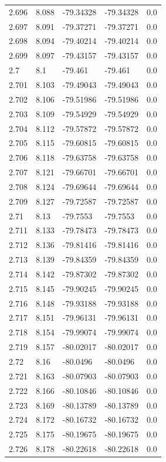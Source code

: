 \begin{tabular}{lllll}
2.696 & 8.088 & -79.34328 & -79.34328 & 0.0 \\
2.697 & 8.091 & -79.37271 & -79.37271 & 0.0 \\
2.698 & 8.094 & -79.40214 & -79.40214 & 0.0 \\
2.699 & 8.097 & -79.43157 & -79.43157 & 0.0 \\
2.7 & 8.1 & -79.461 & -79.461 & 0.0 \\
2.701 & 8.103 & -79.49043 & -79.49043 & 0.0 \\
2.702 & 8.106 & -79.51986 & -79.51986 & 0.0 \\
2.703 & 8.109 & -79.54929 & -79.54929 & 0.0 \\
2.704 & 8.112 & -79.57872 & -79.57872 & 0.0 \\
2.705 & 8.115 & -79.60815 & -79.60815 & 0.0 \\
2.706 & 8.118 & -79.63758 & -79.63758 & 0.0 \\
2.707 & 8.121 & -79.66701 & -79.66701 & 0.0 \\
2.708 & 8.124 & -79.69644 & -79.69644 & 0.0 \\
2.709 & 8.127 & -79.72587 & -79.72587 & 0.0 \\
2.71 & 8.13 & -79.7553 & -79.7553 & 0.0 \\
2.711 & 8.133 & -79.78473 & -79.78473 & 0.0 \\
2.712 & 8.136 & -79.81416 & -79.81416 & 0.0 \\
2.713 & 8.139 & -79.84359 & -79.84359 & 0.0 \\
2.714 & 8.142 & -79.87302 & -79.87302 & 0.0 \\
2.715 & 8.145 & -79.90245 & -79.90245 & 0.0 \\
2.716 & 8.148 & -79.93188 & -79.93188 & 0.0 \\
2.717 & 8.151 & -79.96131 & -79.96131 & 0.0 \\
2.718 & 8.154 & -79.99074 & -79.99074 & 0.0 \\
2.719 & 8.157 & -80.02017 & -80.02017 & 0.0 \\
2.72 & 8.16 & -80.0496 & -80.0496 & 0.0 \\
2.721 & 8.163 & -80.07903 & -80.07903 & 0.0 \\
2.722 & 8.166 & -80.10846 & -80.10846 & 0.0 \\
2.723 & 8.169 & -80.13789 & -80.13789 & 0.0 \\
2.724 & 8.172 & -80.16732 & -80.16732 & 0.0 \\
2.725 & 8.175 & -80.19675 & -80.19675 & 0.0 \\
2.726 & 8.178 & -80.22618 & -80.22618 & 0.0 \\

\end{tabular}
